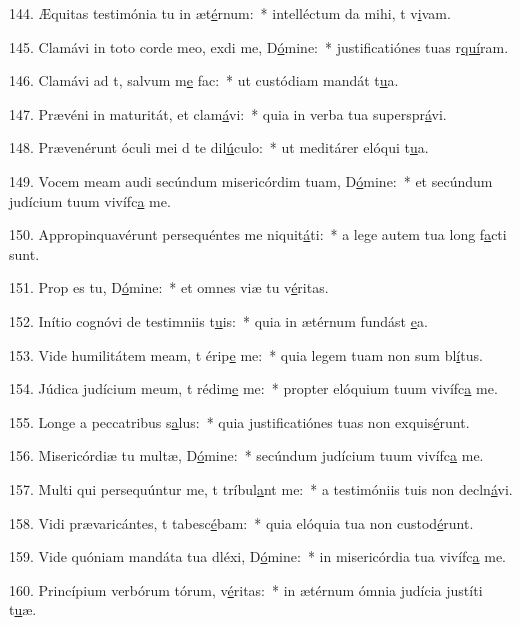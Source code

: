 144. Æquitas testimónia tu in æt\uline{é}rnum:~* intelléctum da mihi, t v\uline{i}vam.\par 
145. Clamávi in toto corde meo, exdi me, D\uline{ó}mine:~* justificatiónes tuas r\uline{quí}ram.\par 
146. Clamávi ad t, salvum m\uline{e} fac:~* ut custódiam mandát t\uline{u}a.\par 
147. Prævéni in maturitát, et clam\uline{á}vi:~* quia in verba tua superspr\uline{á}vi.\par 
148. Prævenérunt óculi mei d te dil\uline{ú}culo:~* ut meditárer elóqui t\uline{u}a.\par 
149. Vocem meam audi secúndum misericórdim tuam, D\uline{ó}mine:~* et secúndum judícium tuum vivífc\uline{a} me.\par 
150. Appropinquavérunt persequéntes me niquit\uline{á}ti:~* a lege autem tua long f\uline{a}cti sunt.\par 
151. Prop es tu, D\uline{ó}mine:~* et omnes viæ tu v\uline{é}ritas.\par 
152. Inítio cognóvi de testimniis t\uline{u}is:~* quia in ætérnum fundást \uline{e}a.\par 
153. Vide humilitátem meam, t érip\uline{e} me:~* quia legem tuam non sum bl\uline{í}tus.\par 
154. Júdica judícium meum, t rédim\uline{e} me:~* propter elóquium tuum vivífc\uline{a} me.\par 
155. Longe a peccatribus s\uline{a}lus:~* quia justificatiónes tuas non exquis\uline{é}runt.\par 
156. Misericórdiæ tu multæ, D\uline{ó}mine:~* secúndum judícium tuum vivífc\uline{a} me.\par 
157. Multi qui persequúntur me, t tríbul\uline{a}nt me:~* a testimóniis tuis non decln\uline{á}vi.\par 
158. Vidi prævaricántes, t tabesc\uline{é}bam:~* quia elóquia tua non custod\uline{é}runt.\par 
159. Vide quóniam mandáta tua dléxi, D\uline{ó}mine:~* in misericórdia tua vivífc\uline{a} me.\par 
160. Princípium verbórum tórum, v\uline{é}ritas:~* in ætérnum ómnia judícia justíti t\uline{u}æ.\par 
